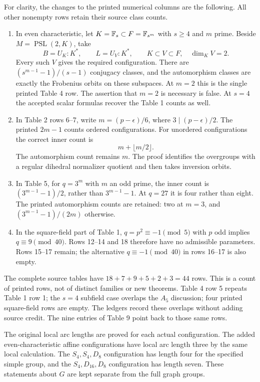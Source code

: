 \documentclass[11pt]{article}
\newcommand{\PSL}{\operatorname{PSL}}\newcommand{\PGL}{\operatorname{PGL}}
\begin{document}
For clarity, the changes to the printed numerical columns are the
following. All other nonempty rows retain their source class counts.
\begin{enumerate}
\item In even characteristic, let $K=\mathbb F_s\subset F=\mathbb F_{s^m}$ with
$s\ge4$ and $m$ prime. Beside $M=\PSL(2,K)$, take
\[
 B=U_K:K^*,\qquad L=U_V:K^*,
 \qquad K\subset V\subset F,\quad\dim_KV=2.
\]
Every such $V$ gives the required configuration. There are
$(s^{m-1}-1)/(s-1)$ conjugacy classes, and the automorphism classes
are exactly the Frobenius orbits on these subspaces. At $m=2$ this
is the single printed Table 4 row. The assertion that $m=2$ is
necessary is false. At $s=4$ the accepted scalar formulas recover
the Table 1 counts as well.
\item In Table 2 rows 6--7, write $m=(p-\epsilon)/6$, where
$3\mid(p-\epsilon)/2$. The printed $2m-1$ counts ordered
configurations. For unordered configurations the correct inner count is
\[
 m+\lfloor m/2\rfloor.
\]
The automorphism count remains $m$. The proof identifies the
overgroups with a regular dihedral normalizer quotient and then
takes inversion orbits.
\item In Table 5, for $q=3^m$ with $m$ an odd prime, the inner count
is $(3^{m-1}-1)/2$, rather than $3^{m-1}-1$. At $q=27$ it is
four rather than eight. The printed automorphism counts are retained:
two at $m=3$, and $(3^{m-1}-1)/(2m)$ otherwise.
\item In the square-field part of Table 1, $q=p^2\equiv-1\pmod5$
with $p$ odd implies $q\equiv9\pmod{40}$. Rows 12--14 and 18
therefore have no admissible parameters. Rows 15--17 remain; the
alternative $q\equiv-1\pmod{40}$ in rows 16--17 is also empty.
\end{enumerate}

The complete source tables have $18+7+9+5+2+3=44$ rows. This is a
count of printed rows, not of distinct families or new theorems. Table 4
row 5 repeats Table 1 row 1; the $s=4$ subfield case overlaps the
$A_5$ discussion; four printed square-field rows are empty. The ledgers
record these overlaps without adding source credit. The nine entries of
Table 9 point back to those same rows.

The original local arc lengths are proved for each actual configuration.
The added even-characteristic affine configurations have local arc length
three by the same local calculation. The $S_4,S_4,D_8$ configuration
has length four for the specified simple group, and the
$S_4,D_{16},D_8$ configuration has length seven. These statements
about $G$ are kept separate from the full graph groups.
\end{document}
